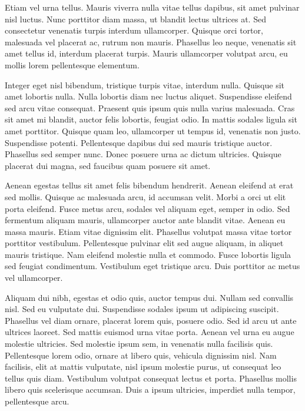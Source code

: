 \documentclass[journal]{IEEEtran}
\begin{document}
Etiam vel urna tellus. Mauris viverra nulla vitae tellus dapibus, sit amet pulvinar nisl luctus. Nunc porttitor diam massa, ut blandit lectus ultrices at. Sed consectetur venenatis turpis interdum ullamcorper. Quisque orci tortor, malesuada vel placerat ac, rutrum non mauris. Phasellus leo neque, venenatis sit amet tellus id, interdum placerat turpis. Mauris ullamcorper volutpat arcu, eu mollis lorem pellentesque elementum.

Integer eget nisl bibendum, tristique turpis vitae, interdum nulla. Quisque sit amet lobortis nulla. Nulla lobortis diam nec luctus aliquet. Suspendisse eleifend sed arcu vitae consequat. Praesent quis ipsum quis nulla varius malesuada. Cras sit amet mi blandit, auctor felis lobortis, feugiat odio. In mattis sodales ligula sit amet porttitor. Quisque quam leo, ullamcorper ut tempus id, venenatis non justo. Suspendisse potenti. Pellentesque dapibus dui sed mauris tristique auctor. Phasellus sed semper nunc. Donec posuere urna ac dictum ultricies. Quisque placerat dui magna, sed faucibus quam posuere sit amet.

Aenean egestas tellus sit amet felis bibendum hendrerit. Aenean eleifend at erat sed mollis. Quisque ac malesuada arcu, id accumsan velit. Morbi a orci ut elit porta eleifend. Fusce metus arcu, sodales vel aliquam eget, semper in odio. Sed fermentum aliquam mauris, ullamcorper auctor ante blandit vitae. Aenean eu massa mauris. Etiam vitae dignissim elit. Phasellus volutpat massa vitae tortor porttitor vestibulum. Pellentesque pulvinar elit sed augue aliquam, in aliquet mauris tristique. Nam eleifend molestie nulla et commodo. Fusce lobortis ligula sed feugiat condimentum. Vestibulum eget tristique arcu. Duis porttitor ac metus vel ullamcorper.

Aliquam dui nibh, egestas et odio quis, auctor tempus dui. Nullam sed convallis nisl. Sed eu vulputate dui. Suspendisse sodales ipsum ut adipiscing suscipit. Phasellus vel diam ornare, placerat lorem quis, posuere odio. Sed id arcu ut ante ultrices laoreet. Sed mattis euismod urna vitae porta. Aenean vel urna eu augue molestie ultricies. Sed molestie ipsum sem, in venenatis nulla facilisis quis. Pellentesque lorem odio, ornare at libero quis, vehicula dignissim nisl. Nam facilisis, elit at mattis vulputate, nisl ipsum molestie purus, ut consequat leo tellus quis diam. Vestibulum volutpat consequat lectus et porta. Phasellus mollis libero quis scelerisque accumsan. Duis a ipsum ultricies, imperdiet nulla tempor, pellentesque arcu.
\end{document}
